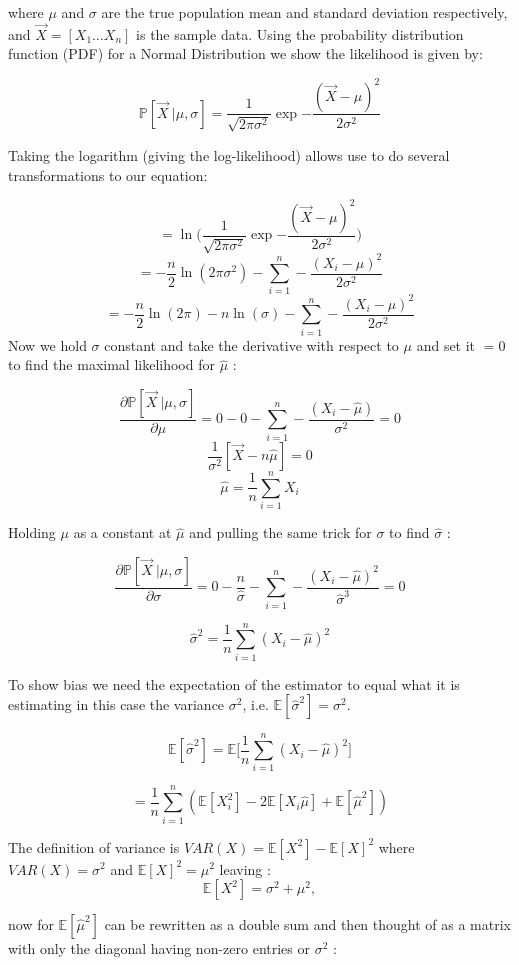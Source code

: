 \documentclass[a4paper,12pt,notitlepage]{article}
\begin{document}
where $\mu$ and $\sigma$ are the true population mean and standard deviation respectively, and $\Vec{X} = [X_1 \dots X_n]$ is the sample data. Using the probability distribution function (PDF) for a Normal Distribution we show the likelihood is given by:

$$\mathbb{P}[\Vec{X}\ |  \mu ,\sigma   ] = \frac{1}{\sqrt{2\pi\sigma^2}}\exp{-\frac{(\Vec{X}-\mu)^2}{2\sigma^2}}$$

Taking the logarithm (giving the log-likelihood) allows use to do several transformations to our equation:

$$=\ln\bigg(\frac{1}{\sqrt{2\pi\sigma^2}}\exp{-\frac{(\Vec{X}-\mu)^2}{2\sigma^2}}\bigg)$$
$$=-\frac{n}{2}\ln{(2\pi\sigma^2)}-\sum_{i=1}^{n}-\frac{(X_i-\mu)^2}{2\sigma^2}$$
$$=-\frac{n}{2}\ln{(2\pi)}-n\ln{(\sigma)}-\sum_{i=1}^{n}-\frac{(X_i-\mu)^2}{2\sigma^2}$$
Now we hold $\sigma$ constant and take the derivative with respect to $\mu$ and set it $=0$ to find the maximal likelihood for $\hat{\mu}$ :

$$\frac{\partial\mathbb{P}[\Vec{X}\ |  \mu ,\sigma   ]}{\partial\mu}=0-0-\sum_{i=1}^{n}-\frac{(X_i-\hat{\mu})}{\sigma^2} = 0$$
$$ \frac{1}{\sigma^2}[\Vec{X} - n\hat{\mu}] =0$$
$$\hat{\mu} = \frac{1}{n}\sum_{i=1}^{n}X_i$$

Holding $\mu$ as a constant at $\hat{\mu}$ and pulling the same trick for $\sigma$ to find $\hat{\sigma}$ :

$$\frac{\partial\mathbb{P}[\Vec{X}\ |  \mu ,\sigma   ]}{\partial\sigma}=0-\frac{n}{\hat{\sigma}}-\sum_{i=1}^{n}-\frac{(X_i-\hat{\mu})^2}{\hat{\sigma}^3} = 0$$

$$\hat{\sigma}^2 =\frac{1}{n} \sum_{i=1}^{n}(X_i-\hat{\mu})^2 $$


To show bias we need the expectation of the estimator to equal what it is estimating in this case the variance $\sigma^2$, i.e. $\mathbb{E}[\hat{\sigma}^2] = \sigma^2$.

$$\mathbb{E}[\hat{\sigma}^2] = \mathbb{E}\bigg[\frac{1}{n} \sum_{i=1}^{n}(X_i-\hat{\mu})^2\bigg]$$

$$ = \frac{1}{n} \sum_{i=1}^{n}(\mathbb{E}[X_i^2] - 2\mathbb{E}[X_i \hat{\mu}] + \mathbb{E}[\hat{\mu}^2])$$

The definition of variance is $VAR(X) = \mathbb{E}[X^2] - \mathbb{E}[X]^2$ where $VAR(X) = \sigma^2$ and $\mathbb{E}[X]^2 = \mu^2$ leaving :
$$\mathbb{E}[X^2] = \sigma^2 + \mu^2,$$

now for $\mathbb{E}[\hat{\mu}^2]$ can be rewritten as a double sum and then thought of as a matrix with only the diagonal having non-zero entries or $\sigma^2$ :
\end{document}
